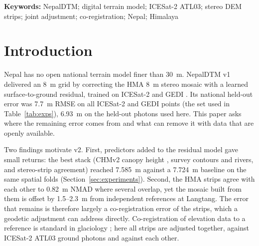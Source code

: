 \documentclass[11pt]{article}
\begin{document}
\noindent\textbf{Keywords:} NepalDTM; digital terrain model; ICESat-2 ATL03; stereo DEM strips; joint adjustment;
co-registration; Nepal; Himalaya

\section{Introduction}
Nepal has no open national terrain model finer than 30~m.
NepalDTM v1 \citep{paudel2026nepaldtm} delivered an 8~m grid by correcting the HMA 8~m stereo mosaic \citep{shean2017hma} with a
learned surface-to-ground residual, trained on ICESat-2 \citep{markus2017icesat2,neuenschwander2019atl08} and
GEDI \citep{dubayah2020gedi}.
Its national held-out error was 7.7~m RMSE on all ICESat-2 and GEDI points (the set used in
Table~\ref{tab:exps}), 6.93~m on the held-out photons used here.
This paper asks where the remaining error comes from and what can remove it with data that are openly available.

Two findings motivate v2.
First, predictors added to the residual model gave small returns: the best stack (CHMv2 canopy height
\citep{brandt2026chmv2}, survey contours and rivers, and stereo-strip agreement) reached 7.585~m against a 7.724~m
baseline on the same spatial folds (Section~\ref{sec:experiments}).
Second, the HMA strips agree with each other to 0.82~m NMAD where several overlap, yet the mosaic built from
them is offset by 1.5--2.3~m from independent references at Langtang.
The error that remains is therefore largely a co-registration error of the strips, which a geodetic adjustment
can address directly.
Co-registration of elevation data to a reference is standard in glaciology \citep{nuth2011coreg}; here all
strips are adjusted together, against ICESat-2 ATL03 ground photons and against each other.
\end{document}
